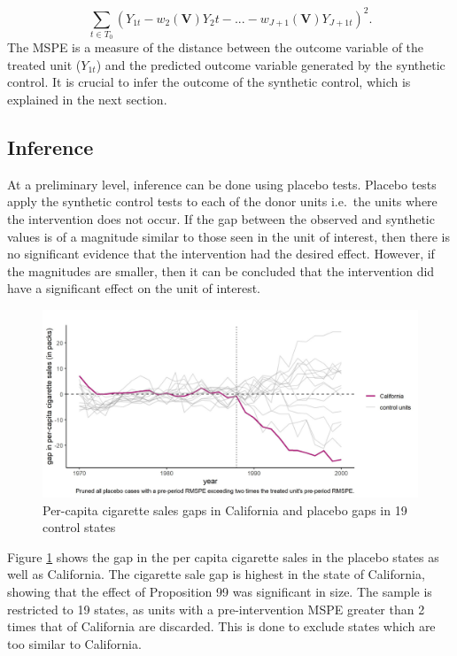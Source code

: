 \documentclass[12pt,nobind, a4paper]{reedthesis}
\begin{document}
 \[ \sum_{t \in T_0}(Y_{1t}- w_{2}(\mathbf{V})Y_2{t}-...-w_{J+1}(\mathbf{V})Y_{J+1t})^2.\]
 The MSPE is a measure of the distance between the outcome variable of the treated unit (\(Y_{1t}\)) and the predicted outcome variable generated by the synthetic control. It is crucial to infer the outcome of the synthetic control, which is explained in the next section.

 \hypertarget{inference}{%
 \subsection{Inference}\label{inference}}

 At a preliminary level, inference can be done using placebo tests. Placebo tests apply the synthetic control tests to each of the donor units i.e.~the units where the intervention does not occur. If the gap between the observed and synthetic values is of a magnitude similar to those seen in the unit of interest, then there is no significant evidence that the intervention had the desired effect. However, if the magnitudes are smaller, then it can be concluded that the intervention did have a significant effect on the unit of interest.
 \begin{figure}

 {\centering \includegraphics[width=1\linewidth]{figure/calplacebo} 

 }

 \caption{Per-capita cigarette sales gaps in California and placebo gaps in 19 control states}\label{fig:placebo}
 \end{figure}
 Figure \ref{fig:placebo} shows the gap in the per capita cigarette sales in the placebo states as well as California. The cigarette sale gap is highest in the state of California, showing that the effect of Proposition 99 was significant in size. The sample is restricted to 19 states, as units with a pre-intervention MSPE greater than 2 times that of California are discarded. This is done to exclude states which are too similar to California.
 \linebreak
\end{document}
